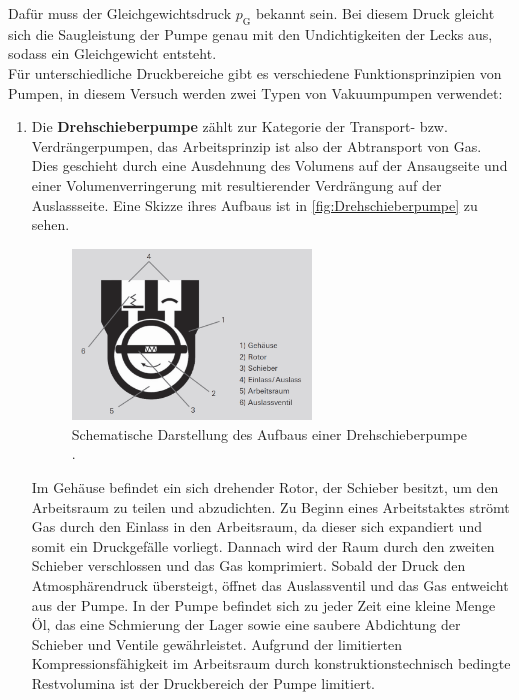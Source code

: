 Dafür muss der Gleichgewichtsdruck $p_{\text{G}}$ bekannt sein. Bei diesem Druck gleicht sich die Saugleistung der Pumpe genau mit den
Undichtigkeiten der Lecks aus, sodass ein Gleichgewicht entsteht. \\
Für unterschiedliche Druckbereiche gibt es verschiedene Funktionsprinzipien von Pumpen, in diesem Versuch werden zwei Typen von Vakuumpumpen verwendet:
\begin{enumerate}
    \item Die \textbf{Drehschieberpumpe} zählt zur Kategorie der Transport- bzw. Verdrängerpumpen, das Arbeitsprinzip ist also der Abtransport von Gas.
    Dies geschieht durch eine Ausdehnung des Volumens auf der Ansaugseite und einer Volumenverringerung mit resultierender Verdrängung auf der Auslassseite.
    Eine Skizze ihres Aufbaus ist in \autoref{fig:Drehschieberpumpe} zu sehen.
    \begin{figure}[H]
        \centering
        \includegraphics[width=0.6\textwidth]{content/pics/drehschieberpumpe.png}
        \caption{Schematische Darstellung des Aufbaus einer Drehschieberpumpe \cite{Pfeiffer_Drehschieberpumpe}.}
        \label{fig:Drehschieberpumpe}
    \end{figure}
    Im Gehäuse befindet ein sich drehender Rotor, der Schieber besitzt, um den Arbeitsraum zu teilen und abzudichten.
    Zu Beginn eines Arbeitstaktes strömt Gas durch den Einlass in den Arbeitsraum, da dieser sich expandiert und somit ein Druckgefälle vorliegt.
    Dannach wird der Raum durch den zweiten Schieber verschlossen und das Gas komprimiert. Sobald der Druck den Atmosphärendruck übersteigt,
    öffnet das Auslassventil und das Gas entweicht aus der Pumpe. In der Pumpe befindet sich zu jeder Zeit eine kleine Menge Öl, das
    eine Schmierung der Lager sowie eine saubere Abdichtung der Schieber und Ventile gewährleistet. Aufgrund der limitierten Kompressionsfähigkeit
    im Arbeitsraum durch konstruktionstechnisch bedingte Restvolumina ist der Druckbereich der Pumpe limitiert.

\end{enumerate}
